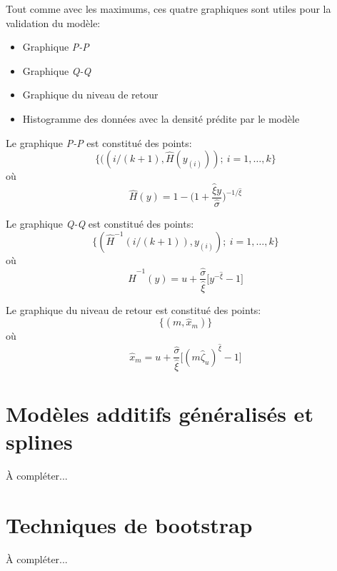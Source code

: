 Tout comme avec les maximums, ces quatre graphiques sont utiles pour la validation du modèle:

\begin{itemize}
\item Graphique \textit{P-P}
\item Graphique \textit{Q-Q}
\item Graphique du niveau de retour
\item Histogramme des données avec la densité prédite par le modèle 
\end{itemize}

Le graphique \textit{P-P} est constitué des points:
\begin{equation*}
\{ ((i/(k+1), \hat{H}(y_{(i)}));\ i=1,\dots,k\}
\end{equation*}
où
\begin{equation*}
\hat{H}(y) = 1 - \Bigg(1+\frac{\hat\xi y}{\hat\sigma}\Bigg)^{-1/\hat\xi}
\end{equation*}

Le graphique \textit{Q-Q} est constitué des points:
\begin{equation*}
\{(\hat{H}^{-1}(i/(k+1)), y_{(i)});\ i=1,\dots,k\}
\end{equation*}
où
\begin{equation*}
\hat{H}^{-1}(y) = u + \frac{\hat\sigma}{\hat\xi}\Big[y^{-\hat\xi}-1\Big]
\end{equation*}

Le graphique du niveau de retour est constitué des points:
\begin{equation*}
\{(m, \hat{x}_m)\}
\end{equation*}
où
\begin{equation*}
{\hat{x}_m = u + \frac{\hat\sigma}{\hat\xi} \Big[(m {\hat\zeta}_u)^{\hat\xi} -1\Big]}
\end{equation*}


\section{Modèles additifs généralisés et splines}
\label{sec:gam}
À compléter...

\section{Techniques de bootstrap}
À compléter...
